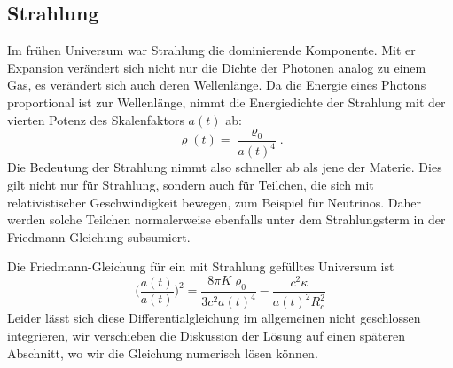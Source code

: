 \subsection{Strahlung}
Im frühen Universum war Strahlung die dominierende Komponente.
Mit er Expansion verändert sich nicht nur die Dichte der Photonen 
analog zu einem Gas, es verändert sich auch deren Wellenlänge.
Da die Energie eines Photons proportional ist zur Wellenlänge,
nimmt die Energiedichte der Strahlung mit der vierten Potenz des
Skalenfaktors $a(t)$ ab:
\[
\varrho(t)=\frac{\varrho_0}{a(t)^4}.
\]
Die Bedeutung der Strahlung nimmt also schneller ab als jene der Materie.
Dies gilt nicht nur für Strahlung, sondern auch für Teilchen, die
sich mit relativistischer Geschwindigkeit bewegen, zum Beispiel für
Neutrinos.
Daher werden solche Teilchen normalerweise ebenfalls unter dem
Strahlungsterm in der Friedmann-Gleichung subsumiert.

Die Friedmann-Gleichung für ein mit Strahlung gefülltes Universum ist
\begin{equation}
\biggl(
\frac{\dot a(t)}{a(t)}
\biggr)^2
=
\frac{8\pi K \varrho_0}{3c^2a(t)^4}
-
\frac{c^2\kappa }{a(t)^2R_c^2}
\end{equation}
Leider lässt sich diese Differentialgleichung im allgemeinen
nicht geschlossen integrieren, wir verschieben die Diskussion der
Lösung auf einen späteren Abschnitt, wo wir die Gleichung numerisch lösen
können.

